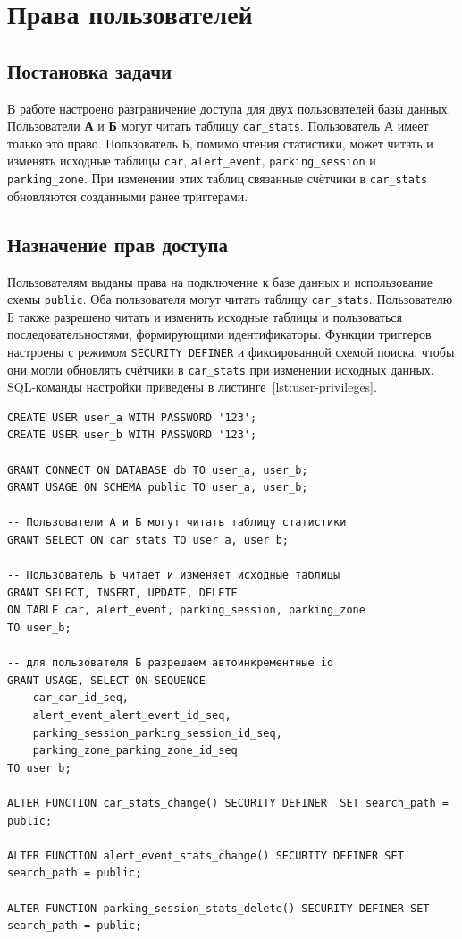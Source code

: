 \section{Права пользователей}

\subsection{Постановка задачи}
В работе настроено разграничение доступа для двух пользователей базы данных.
Пользователи \textbf{А} и \textbf{Б} могут читать таблицу
\texttt{car\_stats}. Пользователь А имеет только это право. Пользователь Б,
помимо чтения статистики, может читать и изменять исходные таблицы
\texttt{car}, \texttt{alert\_event}, \texttt{parking\_session} и
\texttt{parking\_zone}. При изменении этих таблиц связанные счётчики в
\texttt{car\_stats} обновляются созданными ранее триггерами.

\subsection{Назначение прав доступа}
Пользователям выданы права на подключение к базе данных и использование схемы
\texttt{public}. Оба пользователя могут читать таблицу \texttt{car\_stats}.
Пользователю Б также разрешено читать и изменять исходные таблицы и пользоваться
последовательностями, формирующими идентификаторы. Функции триггеров настроены
с режимом \texttt{SECURITY DEFINER} и фиксированной схемой поиска, чтобы они
могли обновлять счётчики в \texttt{car\_stats} при изменении исходных данных.
SQL-команды настройки приведены в листинге~\ref{lst:user-privileges}.

\begin{lstlisting}[style=sqlstyle, caption={Создание пользователей и назначение прав}, label={lst:user-privileges}]
CREATE USER user_a WITH PASSWORD '123';
CREATE USER user_b WITH PASSWORD '123';

GRANT CONNECT ON DATABASE db TO user_a, user_b;
GRANT USAGE ON SCHEMA public TO user_a, user_b;

-- Пользователи А и Б могут читать таблицу статистики
GRANT SELECT ON car_stats TO user_a, user_b;

-- Пользователь Б читает и изменяет исходные таблицы
GRANT SELECT, INSERT, UPDATE, DELETE 
ON TABLE car, alert_event, parking_session, parking_zone
TO user_b;

-- для пользователя Б разрешаем автоинкрементные id
GRANT USAGE, SELECT ON SEQUENCE
	car_car_id_seq, 
	alert_event_alert_event_id_seq, 
	parking_session_parking_session_id_seq, 
	parking_zone_parking_zone_id_seq
TO user_b;

ALTER FUNCTION car_stats_change() SECURITY DEFINER  SET search_path = public;

ALTER FUNCTION alert_event_stats_change() SECURITY DEFINER SET search_path = public;

ALTER FUNCTION parking_session_stats_delete() SECURITY DEFINER SET search_path = public;
\end{lstlisting}

